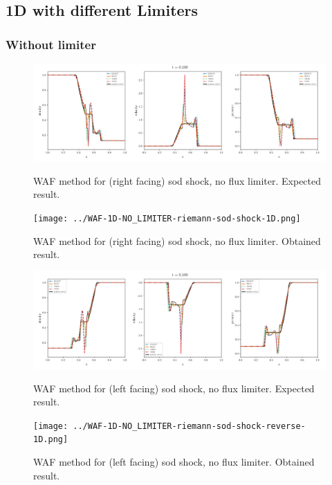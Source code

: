 \subsection{1D with different Limiters}



\subsubsection{Without limiter}

    \begin{figure}[htbp]
        \centering
        \includegraphics[width=.9\textwidth]{./figures/WAF-1D-NO_LIMITER-riemann-sod-shock-1D.png}%
        \caption{WAF method for (right facing) sod shock, no flux limiter. Expected result.}
        \texttt{[image: ../WAF-1D-NO\_LIMITER-riemann-sod-shock-1D.png]}%
        \caption{WAF method for (right facing) sod shock, no flux limiter. Obtained result.}
    \end{figure}


    \begin{figure}[htbp]
        \centering
        \includegraphics[width=.9\textwidth]{./figures/WAF-1D-NO_LIMITER-riemann-sod-shock-reverse-1D.png}%
        \caption{WAF method for (left facing) sod shock, no flux limiter. Expected result.}
        \texttt{[image: ../WAF-1D-NO\_LIMITER-riemann-sod-shock-reverse-1D.png]}%
        \caption{WAF method for (left facing) sod shock, no flux limiter. Obtained result.}
    \end{figure}







